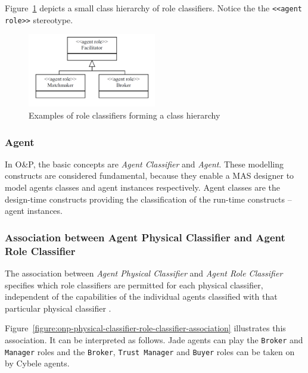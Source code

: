 Figure~\ref{figure:onp-role-classifier-examples} depicts a small class hierarchy of role classifiers.
Notice the the \texttt{<<agent role>>} stereotype.

\begin{figure}[ht]
	\centering
	\includegraphics[width=0.5\textwidth]{images/onp/role-classifier-examples.png}
	\caption{Examples of role classifiers forming a class hierarchy}
	\label{figure:onp-role-classifier-examples}
\end{figure}

\subsubsection*{Agent}

In O\&P, the basic concepts are \textit{Agent Classifier} and \textit{Agent}.
These modelling constructs are considered fundamental, because they enable a MAS designer to model agents classes and agent instances respectively.
Agent classes are the design-time constructs providing the classification of the run-time constructs -- agent instances.

\subsubsection*{Association between Agent Physical Classifier and Agent Role Classifier}

The association between \textit{Agent Physical Classifier} and \textit{Agent Role Classifier} specifies which role classifiers are permitted for each physical classifier, independent of the capabilities of the individual agents classified with that particular physical classifier \cite{Odell05}.

Figure~\ref{figure:onp-physical-classifier-role-classifier-association} illustrates this association.
It can be interpreted as follows. Jade agents can play the \texttt{Broker} and \texttt{Manager} roles and the \texttt{Broker}, \texttt{Trust Manager} and \texttt{Buyer} roles can be taken on by Cybele agents.

